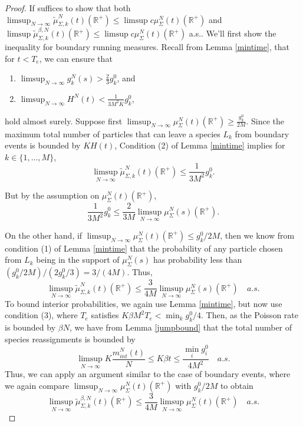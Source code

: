 \begin{proof}If suffices to show that both $\limsup_{N\rightarrow \infty}  \tilde \mu^N_{ \Sigma,k}(t)(\mathbb{R}^+) \le \limsup c\mu_{ \Sigma}^N(t)(\mathbb{R}^+)$ and  $\limsup \tilde \mu^{\beta,N}_{ \Sigma,k}(t)(\mathbb{R}^+) \le \limsup c\mu_{ \Sigma}^N(t)(\mathbb{R}^+)$ a.s.. We'll first show the inequality for boundary running measures.  Recall from Lemma \ref{mintime}, that for $t<T_e$, we can ensure that 
\begin{enumerate}
\item $\limsup_{N\rightarrow \infty} g_k^N(s)> \frac{2}{3} g_k^0$, and 
\item
$\limsup_{N\rightarrow \infty} H^{N}(t)< \frac{1}{3 M^2K}g_k^0$,
\end{enumerate} 
 hold almost surely. Suppose first $\limsup_{N\rightarrow \infty} \mu_{ \Sigma}^N(t)(\mathbb{R}^+)\ge  \frac{g_k^0}{2M}$. Since the maximum total number of particles that can leave a species $L_k$ from boundary events is bounded by $K H(t)$,   Condition (2) of Lemma \ref{mintime} implies  for $k \in \{1, \dots, M\}$, 
\begin{equation}
\limsup_{N\rightarrow \infty} \tilde \mu^N_{ \Sigma,k}(t)(\mathbb{R}^+)\le  \frac{1}{3 M^2}g_k^0. 
\end{equation}

But by the assumption on $\mu_{ \Sigma}^N(t)(\mathbb{R}^+)$,
\begin{equation}
 \frac{1}{3 M^2}g_k^0 \le  \frac 2{3M}\limsup_{N\rightarrow \infty} \mu_\Sigma^N(s)(\mathbb{R}^+).
\end{equation}
     
On the other hand, if $\limsup_{N \rightarrow \infty} \mu_{ \Sigma}^N(t)(\mathbb{R}^+)\le  g_k^0/2M$, then we  know from condition (1) of Lemma \ref{mintime} that the probability of any particle chosen from $L_k$ being in the support of $\mu_\Sigma^N(s)$ has probability less than  $(g_{k}^{0}/2M)/(2g_k^0/3) = 3/(4M)$. Thus,
\begin{equation}
\limsup_{N\rightarrow \infty} \tilde \mu^N_{ \Sigma,k}(t)(\mathbb{R}^+) \le \frac 3{4M}\limsup_{N\rightarrow \infty} \mu_\Sigma^N(s)(\mathbb{R}^+)  \quad a.s.  
\end{equation}
To bound interior probabilities, we again use  Lemma \ref{mintime}, but now use condition (3), where $T_e$ satisfies $K \beta M^{2}T_e <\min_k g_k^0/4$.  Then, as the Poisson rate is bounded by $\beta N$, we have from Lemma \ref{jumpbound} that the total number of species reassignments is bounded by
\begin{equation}
\limsup_{N\rightarrow \infty}K\frac{m_{int}^N(t)}{N}\le K\beta t\le   \frac {\min_i g_i^0}{4M^2}  \quad a.s.
\end{equation}
  Thus, we can apply an argument similar to the case  of boundary events, where we again compare  $\limsup_{N \rightarrow \infty} \mu_{ \Sigma}^N(t)(\mathbb{R}^+)$ with $g_k^0/2M$ to obtain    
 \begin{equation}
 \limsup_{N\rightarrow \infty} \tilde \mu^{\beta,N}_{ \Sigma,k}(t)(\mathbb{R}^+) \le  \frac 3{4M}\limsup_{N\rightarrow \infty} \mu_\Sigma^N(t)(\mathbb{R}^+)         \quad a.s.
\end{equation}
\end{proof}

